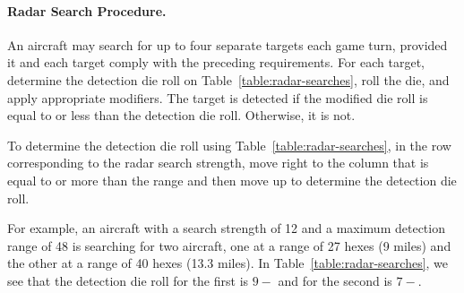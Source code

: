 {}{

\paragraph{Radar Search Procedure.}
An aircraft may search for up to four separate targets each game turn, provided it and each target comply with the preceding requirements. For each target, determine the detection die roll on Table~\ref{table:radar-searches}, roll the die, and apply appropriate modifiers. The target is detected if the modified die roll is equal to or less than the detection die roll. Otherwise, it is not.

To determine the detection die roll using Table~\ref{table:radar-searches}, in the row corresponding to the radar search strength, move right to the column that is equal to or more than the range and then move up to determine the detection die roll.

For example, an aircraft with a search strength of 12 and a maximum detection range of 48 is searching for two aircraft, one at a range of 27 hexes (9 miles) and the other at a range of 40 hexes (13.3 miles). In Table~\ref{table:radar-searches}, we see that the detection die roll for the first is $9-$ and for the second is $7-$.


}
